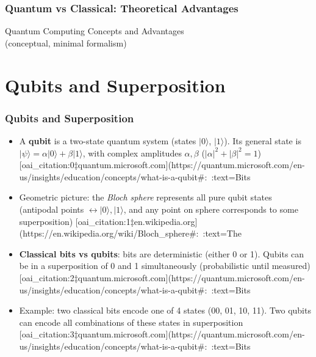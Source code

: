 \documentclass{beamer}
\begin{document}
\begin{frame}
\frametitle{Quantum vs Classical: Theoretical Advantages}
\begin{center}
{\Large Quantum Computing Concepts and Advantages}\\[1ex]
\small (conceptual, minimal formalism)
\end{center}
\end{frame}

\section{Qubits and Superposition}
\begin{frame}
\frametitle{Qubits and Superposition}
\begin{itemize}
  \item A {\bf qubit} is a two-state quantum system (states $|0\rangle$, $|1\rangle$).  Its general state is 
    $|\psi\rangle = \alpha|0\rangle + \beta|1\rangle$, with complex amplitudes $\alpha,\beta$ ($|\alpha|^2+|\beta|^2=1$) [oai_citation:0‡quantum.microsoft.com](https://quantum.microsoft.com/en-us/insights/education/concepts/what-is-a-qubit#:~:text=Bits%
  \item  Geometric picture: the {\em Bloch sphere} represents all pure qubit states (antipodal points $\leftrightarrow |0\rangle,|1\rangle$, and any point on sphere corresponds to some superposition) [oai_citation:1‡en.wikipedia.org](https://en.wikipedia.org/wiki/Bloch_sphere#:~:text=The%
  \item {\bf Classical bits vs qubits}: bits are deterministic (either 0 or 1).  Qubits can be in a superposition of 0 and 1 simultaneously (probabilistic until measured) [oai_citation:2‡quantum.microsoft.com](https://quantum.microsoft.com/en-us/insights/education/concepts/what-is-a-qubit#:~:text=Bits%
  \item Example: two classical bits encode one of 4 states (00, 01, 10, 11).  Two qubits can encode all combinations of these states in superposition [oai_citation:3‡quantum.microsoft.com](https://quantum.microsoft.com/en-us/insights/education/concepts/what-is-a-qubit#:~:text=Bits%
\end{itemize}
\end{frame}
\end{document}

